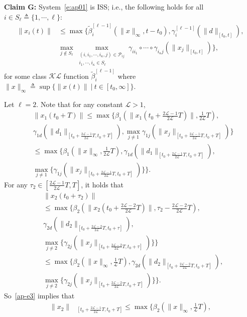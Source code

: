 \documentclass[journal]{IEEEtran}
\newcommand{\nnum}{\nonumber}
\newcommand{\LL}{{\mathcal{L}}}
\begin{document}
\begin{IEEEproof}
\textbf{Claim G:}
System~\eqref{e:ap01} is ISS; i.e., the following holds for all $i\in S_\ell\triangleq \{1,\cdots,\ell\}$:
\begin{align}
\|x_i(t)\|&\leq \max\{\tilde{\beta}^{[\ell-1]}_i(\|x\|_{\infty},t-t_0),
\gamma_i^{[\ell-1]}(\|d\|_{[t_0,t]}),\nnum\\
&\max_{j\notin S_{\ell}}\max_{\substack{(i,i_1,\cdots,i_\kappa,j)\in\mathcal{P}_{ij}\\
i_1,\cdots,i_\kappa\in S_{\ell}}}\gamma_{ii_1}\circ\cdots\circ\gamma_{i_{\kappa}j}(\|x_j\|_{[t_0,t]})\},
\label{ap-e8}
\end{align}
for some class $\mathcal{KL}$ function $\tilde{\beta}^{[\ell-1]}_i$ where $\|x\|_{\infty} \triangleq \sup\{\|x(t)\| \ | \ t \in [t_0, \infty]\}$.
\begin{IEEEproof}
Let $\ell=2$. Note that for any constant $\LL>1$,
\begin{align}
&\|x_1(t_0+T)\|\leq \max\{\beta_1(\|x_1(t_0+\frac{2\LL-1}{2\LL}T)\|,\frac{1}{2\LL}T),\nnum\\
&\gamma_{1d}(\|d_1\|_{[t_0+\frac{2\LL-1}{2\LL}T,t_0+T]}),\max_{j\neq1}\gamma_{1j}(\|x_j\|_{[t_0+\frac{2\LL-1}{2\LL}T,t_0+T]})\}\nnum\\
&\leq \max\{\beta_1(\|x\|_{\infty},\frac{1}{2\LL}T),\gamma_{1d}(\|d_1\|_{[t_0+\frac{2\LL-1}{2\LL}T,t_0+T]}),\nnum\\
&\max_{j\neq1}\{\gamma_{1j}(\|x_j\|_{[t_0+\frac{2\LL-1}{2\LL}T,t_0+T]})\}\}.
\label{ap-e2}
\end{align}
For any $\tau_2\in[\frac{2\LL-1}{2\LL}T, T]$, it holds that \begin{align}&\|x_2(t_0+\tau_2)\|\nnum\\
&\leq \max\{\beta_2(\|x_2(t_0+\frac{2\LL-2}{2\LL}T)\|,\tau_2-\frac{2\LL-2}{2\LL}T),\nnum\\
&\gamma_{2d}(\|d_2\|_{[t_0+\frac{2\LL-2}{2\LL}T,t_0+\tau]}),\nnum\\
&\max_{j\neq2}\{\gamma_{2j}(\|x_j\|_{[t_0+\frac{2\LL-2}{2\LL}T,t_0+\tau]})\}\}\nnum\\
&\leq \max\{\beta_2(\|x\|_{\infty},\frac{1}{\LL}T),
\gamma_{2d}(\|d_2\|_{[t_0+\frac{2\LL-2}{2\LL}T,t_0+T]}),\nnum\\
&\max_{j\neq2}\{\gamma_{2j}(\|x_j\|_{[t_0+\frac{2\LL-2}{2\LL}T,t_0+T]})\}\}.
\label{ap-e3}\end{align}
So~\eqref{ap-e3} implies that \begin{align}\|x_2\|&_{[t_0+\frac{2\LL-1}{2\LL}T, t_0+T]}\leq\max\{\beta_2(\|x\|_{\infty},\frac{1}{\LL}T),\nnum\\

\end{align}
\end{IEEEproof}
\end{IEEEproof}
\end{document}

